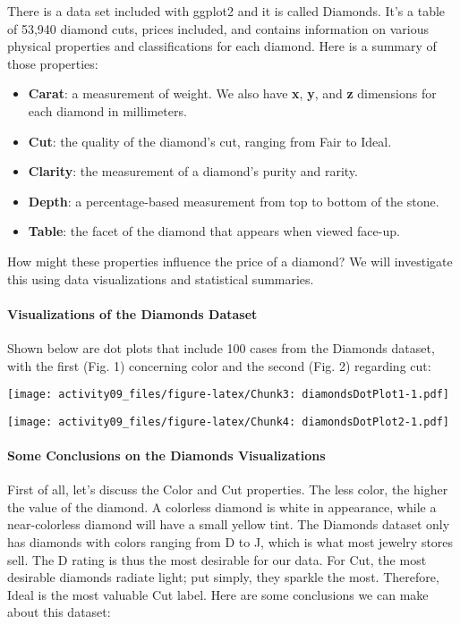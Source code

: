 \documentclass[
]{article}
\begin{document}
There is a data set included with ggplot2 and it is called Diamonds.
It's a table of 53,940 diamond cuts, prices included, and contains
information on various physical properties and classifications for each
diamond. Here is a summary of those properties:

\begin{itemize}
\item
  \textbf{Carat}: a measurement of weight. We also have \textbf{x},
  \textbf{y}, and \textbf{z} dimensions for each diamond in millimeters.
\item
  \textbf{Cut}: the quality of the diamond's cut, ranging from Fair to
  Ideal.
\item
  \textbf{Clarity}: the measurement of a diamond's purity and rarity.
\item
  \textbf{Depth}: a percentage-based measurement from top to bottom of
  the stone.
\item
  \textbf{Table}: the facet of the diamond that appears when viewed
  face-up.
\end{itemize}

How might these properties influence the price of a diamond? We will
investigate this using data visualizations and statistical summaries.

\hypertarget{visualizations-of-the-diamonds-dataset}{%
\paragraph{Visualizations of the Diamonds
Dataset}\label{visualizations-of-the-diamonds-dataset}}

Shown below are dot plots that include 100 cases from the Diamonds
dataset, with the first (Fig. 1) concerning color and the second (Fig.
2) regarding cut:

\texttt{[image: activity09\_files/figure-latex/Chunk3: diamondsDotPlot1-1.pdf]}

\texttt{[image: activity09\_files/figure-latex/Chunk4: diamondsDotPlot2-1.pdf]}

\hypertarget{some-conclusions-on-the-diamonds-visualizations}{%
\paragraph{Some Conclusions on the Diamonds
Visualizations}\label{some-conclusions-on-the-diamonds-visualizations}}

First of all, let's discuss the Color and Cut properties. The less
color, the higher the value of the diamond. A colorless diamond is white
in appearance, while a near-colorless diamond will have a small yellow
tint. The Diamonds dataset only has diamonds with colors ranging from D
to J, which is what most jewelry stores sell. The D rating is thus the
most desirable for our data. For Cut, the most desirable diamonds
radiate light; put simply, they sparkle the most. Therefore, Ideal is
the most valuable Cut label. Here are some conclusions we can make about
this dataset:
\end{document}
